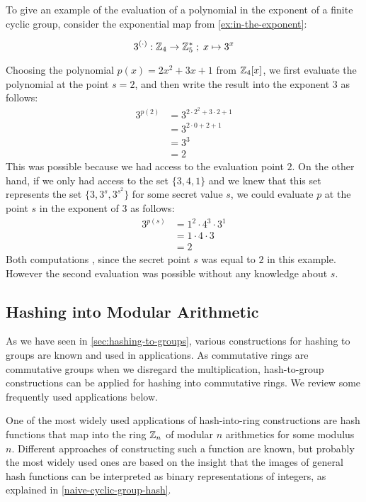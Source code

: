 \begin{example} To give an example of the evaluation of a polynomial in the exponent of a finite cyclic group, consider the exponential map from \examplename{} \ref{ex:in-the-exponent}:

\begin{equation}
3^{(\cdot)}: \mathbb{Z}_4 \to \mathbb{Z}_5^* \;;\; x \mapsto 3^x
\end{equation}

Choosing the polynomial $p(x)= 2x^2 +3x +1$ from $\mathbb{Z}_4[x]$, we first evaluate the polynomial at the point $s=2$, and then write the result into the exponent $3$ as follows:
\begin{align*}
3^{p(2)} &=3^{2\cdot 2^2+3\cdot 2 +1}\\
          & = 3^{2\cdot 0 +2 +1}\\
          & = 3^{3}\\
          & = 2
\end{align*}
This was possible because we had access to the evaluation point $2$. On the other hand, if we only had access to the set $\{3, 4, 1\}$ and we knew that this set represents the set $\{3,3^s, 3^{s^2}\}$ for some secret value $s$, we could evaluate
$p$ at the point $s$ in the exponent of $3$ as follows:
\begin{align*}
3^{p(s)} &= 1^2 \cdot 4^3\cdot 3^1\\
         &= 1\cdot 4\cdot 3\\
         &= 2
\end{align*}
Both computations , since the secret point $s$ was equal to $2$ in this example. However the second evaluation was possible without any knowledge about $s$.
\end{example}

\subsection{Hashing into Modular Arithmetic}
\label{hash-to-modular-arithmetics}
As we have seen in \secname{} \ref{sec:hashing-to-groups}, various constructions for hashing to groups are known and used in applications. As commutative rings are commutative groups when we disregard the multiplication, hash-to-group constructions can be applied for hashing into commutative rings.  We review some frequently used applications below.


One of the most widely used applications of hash-into-ring constructions are hash functions that map into the ring $\mathbb{Z}_n$ of modular $n$ arithmetics for some modulus $n$. Different approaches of constructing such a function are known, but probably the most widely used ones are based on the insight that the images of general hash functions can be interpreted as binary representations of integers, as explained in \examplename{} \ref{naive-cyclic-group-hash}.

